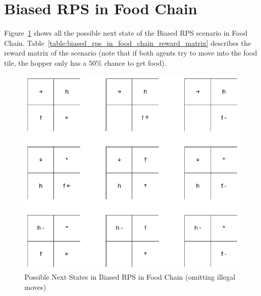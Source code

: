 \documentclass[]{interact}
\theoremstyle{plain}%
\theoremstyle{definition}
\theoremstyle{remark}
\begin{document}



\pagebreak
\appendix

\section{Biased RPS in Food Chain}
Figure~\ref{fig:biased_rps_in_food_chain_possible_next_states} shows all the possible next state of the Biased RPS scenario in Food Chain. Table~\ref{table:biased_rps_in_food_chain_reward_matrix} describes the reward matrix of the scenario (note that if both agents try to move into the food tile, the hopper only has a 50\% chance to get food).

\begin{figure}
\centering
\includegraphics{images/biased_rps_possible_next_states.png}
\caption{Possible Next States in Biased RPS in Food Chain (omitting illegal moves)}
\label{fig:biased_rps_in_food_chain_possible_next_states}
\end{figure}

\begin{table}
\label{table:biased_rps_in_food_chain_reward_matrix}
\end{table}
\end{document}
